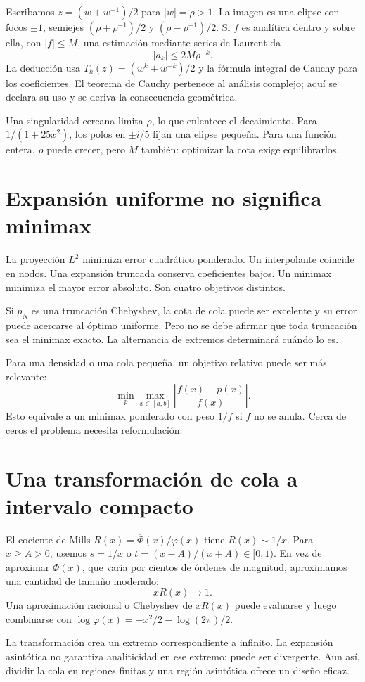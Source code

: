 \documentclass[11pt,a4paper]{article}
\theoremstyle{definition}
\newcommand{\ph}{\varphi}
\newcommand{\Q}{\overline\Phi}
\newcounter{problema}
\begin{document}
Escribamos $z=(w+w^{-1})/2$ para $|w|=\rho>1$. La imagen es una elipse con focos $\pm1$, semiejes $(\rho+\rho^{-1})/2$ y $(\rho-\rho^{-1})/2$. Si $f$ es analítica dentro y sobre ella, con $|f|\le M$, una estimación mediante series de Laurent da
\[
|a_k|\le2M\rho^{-k}.
\]
La deducción usa $T_k(z)=(w^k+w^{-k})/2$ y la fórmula integral de Cauchy para los coeficientes. El teorema de Cauchy pertenece al análisis complejo; aquí se declara su uso y se deriva la consecuencia geométrica.

Una singularidad cercana limita $\rho$, lo que enlentece el decaimiento. Para $1/(1+25x^2)$, los polos en $\pm i/5$ fijan una elipse pequeña. Para una función entera, $\rho$ puede crecer, pero $M$ también: optimizar la cota exige equilibrarlos.

\section{Expansión uniforme no significa minimax}
La proyección $L^2$ minimiza error cuadrático ponderado. Un interpolante coincide en nodos. Una expansión truncada conserva coeficientes bajos. Un minimax minimiza el mayor error absoluto. Son cuatro objetivos distintos.

Si $p_N$ es una truncación Chebyshev, la cota de cola puede ser excelente y su error puede acercarse al óptimo uniforme. Pero no se debe afirmar que toda truncación sea el minimax exacto. La alternancia de extremos determinará cuándo lo es.

Para una densidad o una cola pequeña, un objetivo relativo puede ser más relevante:
\[
\min_p\max_{x\in[a,b]}\left|\frac{f(x)-p(x)}{f(x)}\right|.
\]
Esto equivale a un minimax ponderado con peso $1/f$ si $f$ no se anula. Cerca de ceros el problema necesita reformulación.

\section{Una transformación de cola a intervalo compacto}
El cociente de Mills $R(x)=\Q(x)/\ph(x)$ tiene $R(x)\sim1/x$. Para $x\ge A>0$, usemos $s=1/x$ o
$t=(x-A)/(x+A)\in[0,1)$. En vez de aproximar $\Q(x)$, que varía por cientos de órdenes de magnitud, aproximamos una cantidad de tamaño moderado:
\[
xR(x)\to1.
\]
Una aproximación racional o Chebyshev de $xR(x)$ puede evaluarse y luego combinarse con
$\log\ph(x)=-x^2/2-\log(2\pi)/2$.

La transformación crea un extremo correspondiente a infinito. La expansión asintótica no garantiza analiticidad en ese extremo; puede ser divergente. Aun así, dividir la cola en regiones finitas y una región asintótica ofrece un diseño eficaz.
\end{document}
